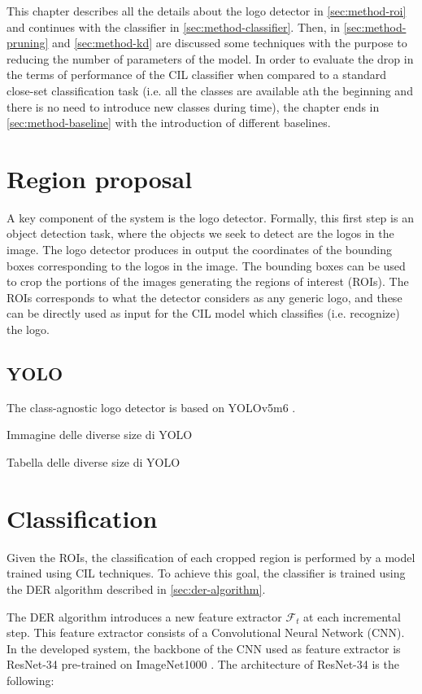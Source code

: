 This chapter describes all the details about the logo detector in \autoref{sec:method-roi} and continues with the classifier in \autoref{sec:method-classifier}. Then, in \autoref{sec:method-pruning} and \autoref{sec:method-kd} are discussed some techniques with the purpose to reducing the number of parameters of the model. In order to evaluate the drop in the terms of performance of the CIL classifier when compared to a standard close-set classification task (i.e. all the classes are available ath the beginning and there is no need to introduce new classes during time),
the chapter ends in \autoref{sec:method-baseline} with the introduction of different baselines.  


\section{Region proposal}
A key component of the system is the logo detector. Formally, this first step is an object detection task, where the objects we seek to detect are the logos in the image. The logo detector produces in output the coordinates of the bounding boxes corresponding to the logos in the image. The bounding boxes can be used to crop the portions of the images generating the regions of interest (ROIs). The ROIs corresponds to what the detector considers as any generic logo, and these can be directly used as input for the CIL model which classifies (i.e. recognize) the logo.


\label{sec:method-roi}
\subsection{YOLO}
The class-agnostic logo detector is based on YOLOv5m6 \cite{glenn_jocher_2021_5563715}.

Immagine delle diverse size di YOLO

Tabella delle diverse size di YOLO

\section{Classification}
Given the ROIs, the classification of each cropped region is performed by a model trained using CIL techniques. To achieve this goal, the classifier is trained using the DER algorithm \cite{yan2021dynamically} described in \autoref{sec:der-algorithm}.

The DER algorithm introduces a new feature extractor $\mathcal{F}_t$ at each incremental step. This feature extractor consists of a Convolutional Neural Network (CNN). In the developed system, the backbone of the CNN used as feature extractor is ResNet-34 \cite{he2016deep} pre-trained on ImageNet1000 \cite{deng2009imagenet}. The architecture of ResNet-34 is the following:


